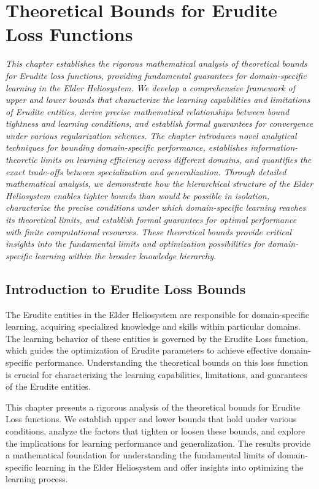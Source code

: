 \chapter{Theoretical Bounds for Erudite Loss Functions}

\textit{This chapter establishes the rigorous mathematical analysis of theoretical bounds for Erudite loss functions, providing fundamental guarantees for domain-specific learning in the Elder Heliosystem. We develop a comprehensive framework of upper and lower bounds that characterize the learning capabilities and limitations of Erudite entities, derive precise mathematical relationships between bound tightness and learning conditions, and establish formal guarantees for convergence under various regularization schemes. The chapter introduces novel analytical techniques for bounding domain-specific performance, establishes information-theoretic limits on learning efficiency across different domains, and quantifies the exact trade-offs between specialization and generalization. Through detailed mathematical analysis, we demonstrate how the hierarchical structure of the Elder Heliosystem enables tighter bounds than would be possible in isolation, characterize the precise conditions under which domain-specific learning reaches its theoretical limits, and establish formal guarantees for optimal performance with finite computational resources. These theoretical bounds provide critical insights into the fundamental limits and optimization possibilities for domain-specific learning within the broader knowledge hierarchy.}

\section{Introduction to Erudite Loss Bounds}

The Erudite entities in the Elder Heliosystem are responsible for domain-specific learning, acquiring specialized knowledge and skills within particular domains. The learning behavior of these entities is governed by the Erudite Loss function, which guides the optimization of Erudite parameters to achieve effective domain-specific performance. Understanding the theoretical bounds on this loss function is crucial for characterizing the learning capabilities, limitations, and guarantees of the Erudite entities.

This chapter presents a rigorous analysis of the theoretical bounds for Erudite Loss functions. We establish upper and lower bounds that hold under various conditions, analyze the factors that tighten or loosen these bounds, and explore the implications for learning performance and generalization. The results provide a mathematical foundation for understanding the fundamental limits of domain-specific learning in the Elder Heliosystem and offer insights into optimizing the learning process.

